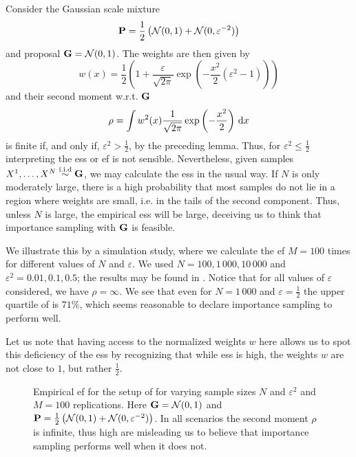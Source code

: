 \begin{example}
    \label{ex:ess_failure}
    Consider the Gaussian scale mixture
    $$
    \P = \frac{1}{2} \left(\mathcal N (0,1) + \mathcal N(0, \varepsilon^{-2})\right)
    $$
    and proposal $\G = \mathcal N(0, 1)$. The weights are then given by 
    $$
        w(x) = \frac{1}{2} \left( 1 + \frac{\varepsilon}{\sqrt{2\pi}} \exp \left( - \frac{x^{2}}{2} \left( \varepsilon^{2} - 1\right) \right)\right)
    $$ and their second moment w.r.t. $\G$ 
    $$
    \rho = \int w^{2}(x) \frac{1}{\sqrt{2\pi}} \exp \left( -\frac{x^{2}}{2} \right) \d x
    $$
    is finite if, and only if, $\varepsilon^{2} > \frac{1}{2}$, by the preceding lemma. Thus, for $\varepsilon^{2} \leq \frac{1}{2}$ interpreting the \acrshort{ess} or \acrshort{ef} is not sensible. Nevertheless, given samples $X^{1}, \dots, X^{N} \iid \G$, we may calculate the \acrshort{ess} in the usual way. If $N$ is only moderately large, there is a high probability that most samples do not lie in a region where weights are small, i.e. in the tails of the second component. Thus, unless $N$ is large, the empirical \acrshort{ess} will be large, deceiving us to think that importance sampling with $\G$ is feasible.

    We illustrate this by a simulation study, where we calculate the \acrshort{ef} $M=100$ times for different values of $N$ and $\varepsilon$. We used $N = 100, 1\,000, 10\,000$ and $\varepsilon^{2} = 0.01, 0.1, 0.5$; the results may be found in . Notice that for all values of $\varepsilon$ considered, we have $\rho = \infty$. We see that even for $N = 1\,000$ and $\varepsilon = \frac{1}{2}$ the upper quartile of  is $71\%$, which seems reasonable to declare importance sampling to perform well. 

    Let us note that having access to the normalized weights $w$ here allows us to spot this deficiency of the \acrshort{ess} by recognizing that while \acrshort{ess} is high, the weights $w$ are not close to $1$, but rather $\frac{1}{2}$.

    \begin{figure}
        \centering

        \resizebox{\textwidth}{!}{%
        }
        \caption{Empirical \acrshort{ef} for the setup of  for varying sample sizes $N$ and $\varepsilon^{2}$ and $M=100$ replications. Here $\G = \mathcal N(0,1)$ and $\P = \frac{1}{2} \left( \mathcal N (0,1) + \mathcal N(0, \varepsilon^{-2}) \right)$. In all scenarios the second moment $\rho$ is infinite, thus high  are misleading us to believe that importance sampling performs well when it does not.}
        \label{fig:ess_failure}
    \end{figure}

\end{example}


